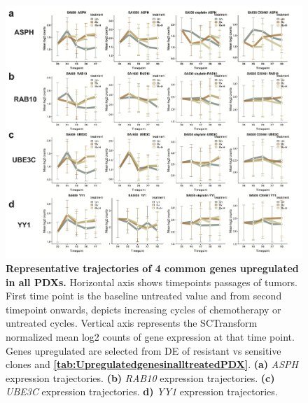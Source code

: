 \begin{figure}
\centering
  \includegraphics[width=\textwidth]{Figures/chap5/commongenesfromvolcanoplots.png}
	
\caption[Representative trajectories of 4 common genes upregulated in all PDX]
	{\small
	\textbf{Representative trajectories of 4 common genes upregulated in all PDXs.}
	   Horizontal axis shows timepoints passages of tumors. First time point is the baseline untreated value and from second timepoint onwards, depicts increasing cycles of chemotherapy or untreated cycles. Vertical axis represents the SCTransform normalized mean log2 counts of gene expression at that time point. Genes upregulated are selected from \ac{DE} of resistant vs sensitive clones and \textbf{\autoref{tab:UpregulatedgenesinalltreatedPDX}}.
	   \textbf{(a)} \textit{ASPH} expression trajectories.
	    \textbf{(b)} \textit{RAB10} expression trajectories.
	    \textbf{(c)} \textit{UBE3C} expression trajectories.
	     \textbf{d)} \textit{YY1} expression trajectories.
	}
	\label{fig:commongenesfromvolcanoplots}
\end{figure}


